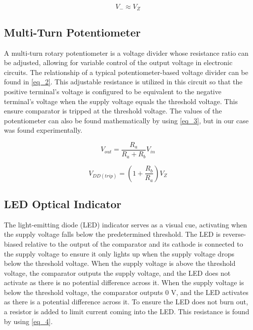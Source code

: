 \documentclass[conference]{IEEEtran}
\begin{document}
\begin{equation}
V_- \approx V_Z\label{eq_1}
\end{equation}

\subsection{Multi-Turn Potentiometer}

A multi-turn rotary potentiometer is a voltage divider whose resistance ratio can be adjusted, allowing for variable control of the output voltage in electronic circuits. The relationship of a typical potentiometer-based voltage divider can be found in \eqref{eq_2}. This adjustable resistance is utilized in this circuit so that the positive terminal's voltage is configured to be equivalent to the negative terminal's voltage when the supply voltage equals the threshold voltage. This ensure comparator is tripped at the threshold voltage. The values of the potentiometer can also be found mathematically by using \eqref{eq_3}, but in our case was found experimentally.

\begin{equation}
V_{out} = \frac{R_a}{R_a + R_b} V_{in}\label{eq_2}
\end{equation}

\begin{equation}
V_{DD(trip)} = (1 + \frac{R_b}{R_a})V_{Z}\label{eq_3}
\end{equation}

\subsection{LED Optical Indicator}

The light-emitting diode (LED) indicator serves as a visual cue, activating when the supply voltage falls below the predetermined threshold. The LED is reverse-biased relative to the output of the comparator and its cathode is connected to the supply voltage to ensure it only lights up when the supply voltage drops below the threshold voltage. When the supply voltage is above the threshold voltage, the comparator outputs the supply voltage, and the LED does not activate as there is no potential difference across it. When the supply voltage is below the threshold voltage, the comparator outputs 0 V, and the LED activates as there is a potential difference across it. To ensure the LED does not burn out, a resistor is added to limit current coming into the LED. This resistance is found by using \eqref{eq_4}.
\end{document}

